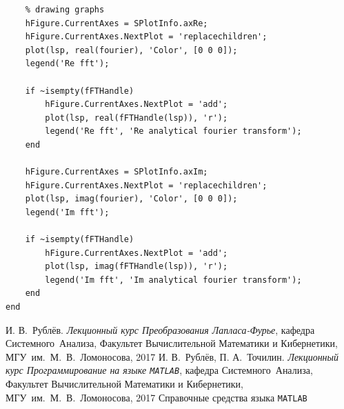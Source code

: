 \documentclass[11pt, oneside, final]{article}
\numberwithin{equation}{section}
\begin{document}
\begin{verbatim}
    % drawing graphs
    hFigure.CurrentAxes = SPlotInfo.axRe;
    hFigure.CurrentAxes.NextPlot = 'replacechildren';
    plot(lsp, real(fourier), 'Color', [0 0 0]); 
    legend('Re fft');
 
    if ~isempty(fFTHandle) 
        hFigure.CurrentAxes.NextPlot = 'add';
        plot(lsp, real(fFTHandle(lsp)), 'r');
        legend('Re fft', 'Re analytical fourier transform');
    end

    hFigure.CurrentAxes = SPlotInfo.axIm;
    hFigure.CurrentAxes.NextPlot = 'replacechildren';
    plot(lsp, imag(fourier), 'Color', [0 0 0]);
    legend('Im fft');

    if ~isempty(fFTHandle) 
        hFigure.CurrentAxes.NextPlot = 'add';
        plot(lsp, imag(fFTHandle(lsp)), 'r');
        legend('Im fft', 'Im analytical fourier transform');
    end
end
    \end{verbatim}
    \begin{thebibliography}{0}
         И. В.~Рублёв. \emph{Лекционный курс Преобразования Лапласа-Фурье},
        кафедра Системного~Анализа, Факультет Вычислительной Математики и Кибернетики, МГУ~им.~М.~В.~Ломоносова, 
        2017
         И. В.~Рублёв, П. А.~Точилин. \emph{Лекционный курс Программирование на языке \texttt{MATLAB}},
        кафедра Системного~Анализа, Факультет Вычислительной Математики и Кибернетики, МГУ~им.~М.~В.~Ломоносова, 
        2017
         Справочные средства языка \texttt{MATLAB}
    \end{thebibliography}
\end{document}
